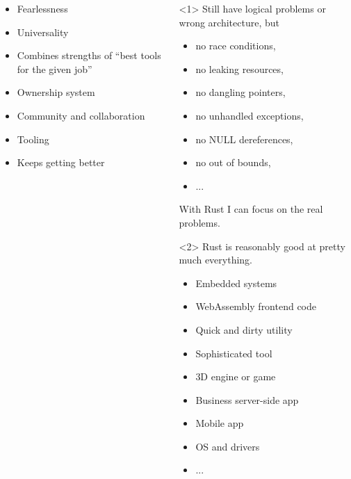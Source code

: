 \begin{frame}{\insertsection}

  \begin{columns}
    \begin{column}{.4\textwidth}
      \begin{itemize}[<+-|alert@+>]
      \item Fearlessness
      \item Universality
      \item Combines strengths of ``best tools for the given job''
      \item Ownership system
      \item Community and collaboration
      \item Tooling
      \item Keeps getting better
      \end{itemize}
    \end{column}
    \begin{column}{.6\textwidth}
      \begin{onlyenv}<1>%
        Still have logical problems or wrong architecture, but
        \begin{itemize}
        \item no race conditions,
        \item no leaking resources,
        \item no dangling pointers,
        \item no unhandled exceptions,
        \item no NULL dereferences,
        \item no out of bounds,
        \item ...
        \end{itemize}
        With Rust I can focus on the real problems.
      \end{onlyenv}

      \begin{onlyenv}<2>%
        Rust is reasonably good at pretty much everything.
        \begin{itemize}
        \item Embedded systems
        \item WebAssembly frontend code
        \item Quick and dirty utility
        \item Sophisticated tool
        \item 3D engine or game
        \item Business server-side app
        \item Mobile app
        \item OS and drivers
        \item ...
        \end{itemize}
      \end{onlyenv}


\end{column}
\end{columns}
\end{frame}
